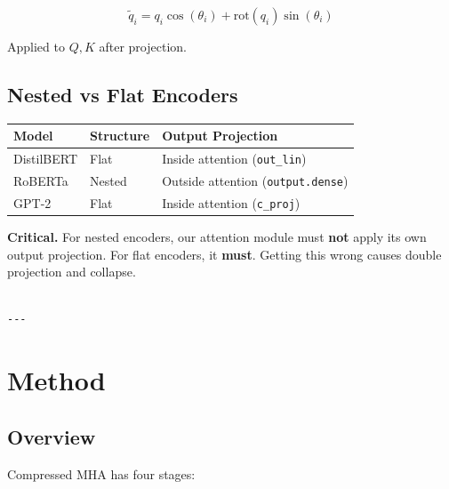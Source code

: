 \[
\tilde{q}_i = q_i \cos(\theta_i) + \text{rot}(q_i) \sin(\theta_i)
\]

Applied to $Q, K$ after projection.

\subsection{Nested vs Flat Encoders}

\begin{table}[H]
\centering
\small
\begin{tabular}{lll}
\toprule
\textbf{Model} & \textbf{Structure} & \textbf{Output Projection} \\
\midrule
DistilBERT & Flat & Inside attention (\texttt{out\_lin}) \\
RoBERTa & Nested & Outside attention (\texttt{output.dense}) \\
GPT-2 & Flat & Inside attention (\texttt{c\_proj}) \\
\bottomrule
\end{tabular}
\end{table}

\textbf{Critical.} For nested encoders, our attention module must \textbf{not} apply 
its own output projection. For flat encoders, it \textbf{must}. Getting this 
wrong causes double projection and collapse.
\begin{lstlisting}

---
\end{lstlisting}

\section{Method}

\subsection{Overview}

Compressed MHA has four stages:

